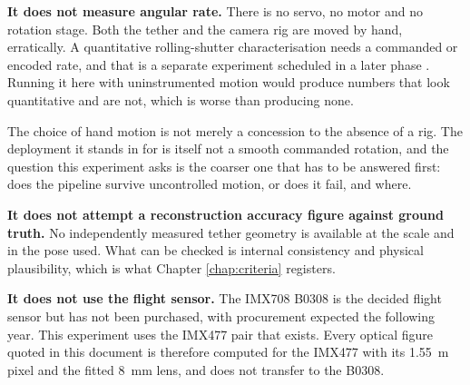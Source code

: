 \textbf{It does not measure angular rate.} There is no servo, no motor and no
rotation stage. Both the tether and the camera rig are moved by hand,
erratically. A quantitative rolling-shutter characterisation needs a commanded
or encoded rate, and that is a separate experiment scheduled in a later phase
\cite{linku_rollingshutter}. Running it here with uninstrumented motion would
produce numbers that look quantitative and are not, which is worse than
producing none.

The choice of hand motion is not merely a concession to the absence of a rig.
The deployment it stands in for is itself not a smooth commanded rotation, and
the question this experiment asks is the coarser one that has to be answered
first: does the pipeline survive uncontrolled motion, or does it fail, and
where.

\textbf{It does not attempt a reconstruction accuracy figure against ground
truth.} No independently measured tether geometry is available at the scale
and in the pose used. What can be checked is internal consistency and physical
plausibility, which is what Chapter \ref{chap:criteria} registers.

\textbf{It does not use the flight sensor.} The IMX708 B0308 is the decided
flight sensor but has not been purchased, with procurement expected the
following year. This experiment uses the IMX477 pair that exists. Every
optical figure quoted in this document is therefore computed for the IMX477
with its 1.55~\textmu m pixel and the fitted 8~mm lens, and does not transfer
to the B0308.
